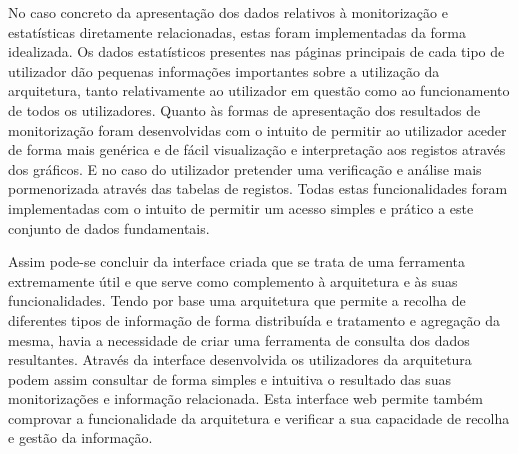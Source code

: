 No caso concreto da apresentação dos dados relativos à monitorização e estatísticas diretamente relacionadas, estas foram implementadas da forma idealizada. Os dados estatísticos presentes nas páginas principais de cada tipo de utilizador dão pequenas informações importantes sobre a utilização da arquitetura, tanto relativamente ao utilizador em questão como ao funcionamento de todos os utilizadores. Quanto às formas de apresentação dos resultados de monitorização foram desenvolvidas com o intuito de permitir ao utilizador aceder de forma mais genérica e de fácil visualização e interpretação aos registos através dos gráficos. E no caso do utilizador pretender uma verificação e análise mais pormenorizada através das tabelas de registos. Todas estas funcionalidades foram implementadas com o intuito de permitir um acesso simples e prático a este conjunto de dados fundamentais.

Assim pode-se concluir da interface criada que se trata de uma ferramenta extremamente útil e que serve como complemento à arquitetura e às suas funcionalidades. Tendo por base uma arquitetura que permite a recolha de diferentes tipos de informação de forma distribuída e tratamento e agregação da mesma, havia a necessidade de criar uma ferramenta de consulta dos dados resultantes. Através da interface desenvolvida os utilizadores da arquitetura podem assim consultar de forma simples e intuitiva o resultado das suas monitorizações e informação relacionada. Esta interface web permite também comprovar a funcionalidade da arquitetura e verificar a sua capacidade de recolha e gestão da informação.

